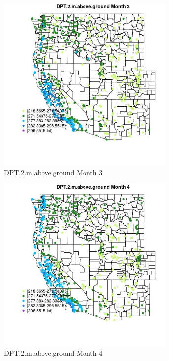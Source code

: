 \begin{figure} 
\centering  
\includegraphics[width=0.77\textwidth]{Code_Outputs/Report_ML_input_PM25_Step4_part_e_de_duplicated_aves_compiled_2019-05-14wNAs_MapObsMo3DPT2maboveground.jpg} 
\caption{\label{fig:Report_ML_input_PM25_Step4_part_e_de_duplicated_aves_compiled_2019-05-14wNAsMapObsMo3DPT2maboveground}DPT.2.m.above.ground Month 3} 
\end{figure} 
 

\begin{figure} 
\centering  
\includegraphics[width=0.77\textwidth]{Code_Outputs/Report_ML_input_PM25_Step4_part_e_de_duplicated_aves_compiled_2019-05-14wNAs_MapObsMo4DPT2maboveground.jpg} 
\caption{\label{fig:Report_ML_input_PM25_Step4_part_e_de_duplicated_aves_compiled_2019-05-14wNAsMapObsMo4DPT2maboveground}DPT.2.m.above.ground Month 4} 
\end{figure} 
 

